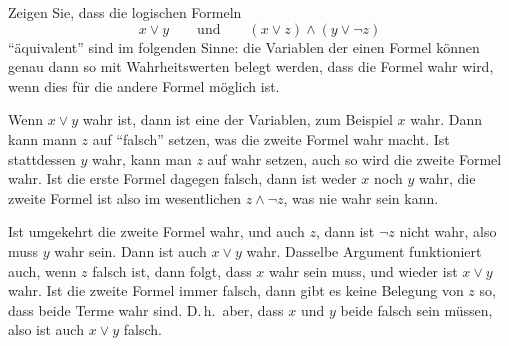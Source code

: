 Zeigen Sie, dass die logischen Formeln
\[
x\vee y\qquad\text{und}\qquad (x\vee z)\wedge (y\vee \neg z)
\]
``äquivalent'' sind im folgenden Sinne: die Variablen der einen Formel
können genau dann so mit Wahrheitswerten
belegt werden, dass die Formel wahr wird, wenn dies für die andere Formel
möglich ist.

\begin{loesung}
Wenn $x\vee y$ wahr ist, dann ist eine der Variablen, zum Beispiel
$x$ wahr.
Dann kann mann $z$ auf ``falsch'' setzen, was die zweite Formel wahr macht.
Ist stattdessen $y$ wahr, kann man $z$ auf wahr setzen, auch so wird die
zweite Formel wahr.
Ist die erste Formel dagegen falsch, dann ist weder $x$ noch $y$ wahr,
die zweite Formel ist also im wesentlichen $z\wedge \neg z$, was nie
wahr sein kann.

Ist umgekehrt die zweite Formel wahr, und auch $z$, dann ist $\neg z$ nicht 
wahr, also muss $y$ wahr sein. Dann ist auch $x\vee y$ wahr. Dasselbe
Argument funktioniert auch, wenn $z$ falsch ist, dann folgt, dass $x$
wahr sein muss, und wieder ist $x\vee y$ wahr.
Ist die zweite Formel immer falsch, dann gibt es keine Belegung von
$z$ so, dass beide Terme wahr sind.
D.\,h.~aber, dass $x$ und $y$ beide falsch sein müssen, also ist auch
$x\vee y$ falsch.


\end{loesung}
